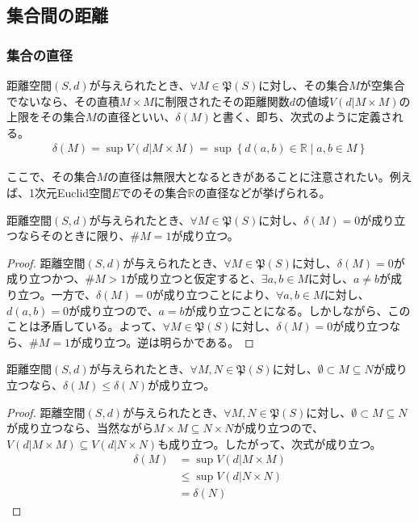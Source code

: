 \documentclass[dvipdfmx]{jsarticle}
\begin{document}
\subsection{集合間の距離}%
\subsubsection{集合の直径}%
\begin{dfn}
距離空間$(S,d)$が与えられたとき、$\forall M \in \mathfrak{P}(S)$に対し、その集合$M$が空集合でないなら、その直積$M \times M$に制限されたその距離関数$d$の値域$V\left( d|M \times M \right)$の上限をその集合$M$の直径といい、$\delta(M)$と書く、即ち、次式のように定義される。
\begin{align*}
\delta(M) = \sup{V\left( d|M \times M \right)} = \sup\left\{ d(a,b) \in \mathbb{R} \middle| a,b \in M \right\}
\end{align*}
\end{dfn}\par
ここで、その集合$M$の直径は無限大となるときがあることに注意されたい。例えば、1次元Euclid空間$E$でのその集合$\mathbb{R}$の直径などが挙げられる。
\begin{thm}\label{8.2.3.1}
距離空間$(S,d)$が与えられたとき、$\forall M \in \mathfrak{P}(S)$に対し、$\delta(M) = 0$が成り立つならそのときに限り、${\#}M = 1$が成り立つ。
\end{thm}
\begin{proof}
距離空間$(S,d)$が与えられたとき、$\forall M \in \mathfrak{P}(S)$に対し、$\delta(M) = 0$が成り立つかつ、${\#}M > 1$が成り立つと仮定すると、$\exists a,b \in M$に対し、$a \neq b$が成り立つ。一方で、$\delta(M) = 0$が成り立つことにより、$\forall a,b \in M$に対し、$d(a,b) = 0$が成り立つので、$a = b$が成り立つことになる。しかしながら、このことは矛盾している。よって、$\forall M \in \mathfrak{P}(S)$に対し、$\delta(M) = 0$が成り立つなら、${\#}M = 1$が成り立つ。逆は明らかである。
\end{proof}
\begin{thm}\label{8.2.3.2}
距離空間$(S,d)$が与えられたとき、$\forall M,N \in \mathfrak{P}(S)$に対し、$\emptyset \subset M \subseteq N$が成り立つなら、$\delta(M) \leq \delta(N)$が成り立つ。
\end{thm}
\begin{proof}
距離空間$(S,d)$が与えられたとき、$\forall M,N \in \mathfrak{P}(S)$に対し、$\emptyset \subset M \subseteq N$が成り立つなら、当然ながら$M \times M \subseteq N \times N$が成り立つので、$V\left( d|M \times M \right) \subseteq V\left( d|N \times N \right)$も成り立つ。したがって、次式が成り立つ。
\begin{align*}
\delta(M) &= \sup{V\left( d|M \times M \right)}\\
&\leq \sup{V\left( d|N \times N \right)}\\
&= \delta(N)
\end{align*}
\end{proof}
\end{document}
